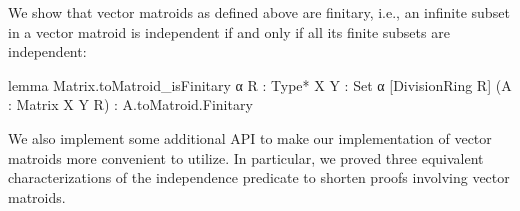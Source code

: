 We show that vector matroids as defined above are finitary, i.e., an infinite subset in a vector matroid is independent if and only if all its finite subsets are independent:
\begin{leancode}
lemma Matrix.toMatroid_isFinitary {α R : Type*}
    {X Y : Set α} [DivisionRing R]
    (A : Matrix X Y R) :
    A.toMatroid.Finitary
\end{leancode}

We also implement some additional API to make our implementation of vector matroids more convenient to utilize. In particular, we proved three equivalent characterizations of the independence predicate to shorten proofs involving vector matroids.
